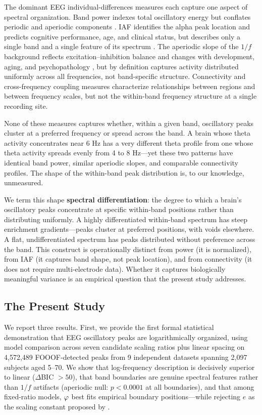 The dominant EEG individual-differences measures each capture one aspect of spectral organization. Band power indexes total oscillatory energy but conflates periodic and aperiodic components \parencite{donoghue2020fooof}. IAF identifies the alpha peak location and predicts cognitive performance, age, and clinical status, but describes only a single band and a single feature of its spectrum \parencite{klimesch1999eeg,corcoran2018iaf,grandy2013iaf}. The aperiodic slope of the $1/f$ background reflects excitation--inhibition balance and changes with development, aging, and psychopathology \parencite{voytek2015aperiodic}, but by definition captures activity distributed uniformly across all frequencies, not band-specific structure. Connectivity and cross-frequency coupling measures \parencite{keitel2016spectral,mahjoory2020frequency} characterize relationships between regions and between frequency scales, but not the within-band frequency structure at a single recording site.

None of these measures captures whether, within a given band, oscillatory peaks cluster at a preferred frequency or spread across the band. A brain whose theta activity concentrates near 6 Hz has a very different theta profile from one whose theta activity spreads evenly from 4 to 8 Hz---yet these two patterns have identical band power, similar aperiodic slopes, and comparable connectivity profiles. The shape of the within-band peak distribution is, to our knowledge, unmeasured.

We term this shape \textbf{spectral differentiation}: the degree to which a brain's oscillatory peaks concentrate at specific within-band positions rather than distributing uniformly. A highly differentiated within-band spectrum has steep enrichment gradients---peaks cluster at preferred positions, with voids elsewhere. A flat, undifferentiated spectrum has peaks distributed without preference across the band. This construct is operationally distinct from power (it is normalized), from IAF (it captures band shape, not peak location), and from connectivity (it does not require multi-electrode data). Whether it captures biologically meaningful variance is an empirical question that the present study addresses.

\subsection{The Present Study}

We report three results. First, we provide the first formal statistical demonstration that EEG oscillatory peaks are logarithmically organized, using model comparison across seven candidate scaling ratios plus linear spacing on 4,572,489 FOOOF-detected peaks from 9 independent datasets spanning 2,097 subjects aged 5--70. We show that log-frequency description is decisively superior to linear ($\Delta$BIC $> 50$), that band boundaries are genuine spectral features rather than $1/f$ artifacts (aperiodic null: $p < 0.0001$ at all boundaries), and that among fixed-ratio models, $\varphi$ best fits empirical boundary positions---while rejecting $e$ as the scaling constant proposed by \textcite{penttonen2003natural}.

